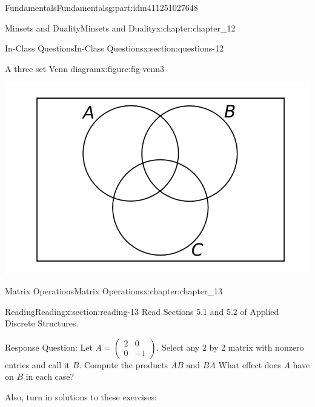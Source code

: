 \documentclass[oneside,10pt,]{book}
\numberwithin{equation}{section}
\begin{document}
\begin{partptx}{Fundamentals}{}{Fundamentals}{}{}{g:part:idm411251027648}
\begin{chapterptx}{Minsets and Duality}{}{Minsets and Duality}{}{}{x:chapter:chapter_12}
\begin{sectionptx}{In-Class Questions}{}{In-Class Questions}{}{}{x:section:questions-12}
\begin{enumerate}[label=\arabic*.]
\end{enumerate}
%
\begin{figureptx}{A three set Venn diagram}{x:figure:fig-venn3}{}%
\begin{image}{0.05}{0.9}{0.05}%
\includegraphics[width=\linewidth]{images/fig-venn3.png}
\end{image}%
\tcblower
\end{figureptx}%
\end{sectionptx}
\end{chapterptx}
%
\typeout{************************************************}
\typeout{************************************************}
%
\begin{chapterptx}{Matrix Operations}{}{Matrix Operations}{}{}{x:chapter:chapter_13}
\index{}%
%
%
\typeout{************************************************}
\typeout{************************************************}
%
\begin{sectionptx}{Reading}{}{Reading}{}{}{x:section:reading-13}
Read Sections 5.1 and 5.2 of Applied Discrete Structures.%
\par
Response Question:  Let \(A=\left(\begin{array}{cc} 2 & 0\\ 0 & -1 \end{array}\right)\). Select any 2 by 2 matrix with nonzero entries and call it \(B\). Compute the products \(AB \textrm{ and }BA\)  What effect does \(A\) have on \(B\) in each case?%
\par
Also, turn in solutions to these exercises:%
\end{sectionptx}
\end{chapterptx}
\end{partptx}
\end{document}
